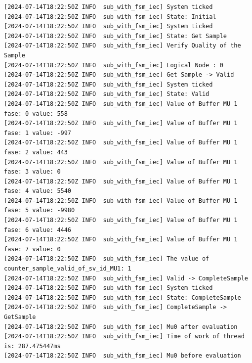 \begin{lstlisting}[caption={First scenario showing the steps through the state machine between the state Get Sample -> Valid, Valid -> Complete Sample -> Get Sample.}]
[2024-07-14T18:22:50Z INFO  sub_with_fsm_iec] System ticked
[2024-07-14T18:22:50Z INFO  sub_with_fsm_iec] State: Initial
[2024-07-14T18:22:50Z INFO  sub_with_fsm_iec] System ticked
[2024-07-14T18:22:50Z INFO  sub_with_fsm_iec] State: Get Sample
[2024-07-14T18:22:50Z INFO  sub_with_fsm_iec] Verify Quality of the Sample
[2024-07-14T18:22:50Z INFO  sub_with_fsm_iec] Logical Node : 0
[2024-07-14T18:22:50Z INFO  sub_with_fsm_iec] Get Sample -> Valid
[2024-07-14T18:22:50Z INFO  sub_with_fsm_iec] System ticked
[2024-07-14T18:22:50Z INFO  sub_with_fsm_iec] State: Valid
[2024-07-14T18:22:50Z INFO  sub_with_fsm_iec] Value of Buffer MU 1 fase: 0 value: 558
[2024-07-14T18:22:50Z INFO  sub_with_fsm_iec] Value of Buffer MU 1 fase: 1 value: -997
[2024-07-14T18:22:50Z INFO  sub_with_fsm_iec] Value of Buffer MU 1 fase: 2 value: 443
[2024-07-14T18:22:50Z INFO  sub_with_fsm_iec] Value of Buffer MU 1 fase: 3 value: 0
[2024-07-14T18:22:50Z INFO  sub_with_fsm_iec] Value of Buffer MU 1 fase: 4 value: 5540
[2024-07-14T18:22:50Z INFO  sub_with_fsm_iec] Value of Buffer MU 1 fase: 5 value: -9980
[2024-07-14T18:22:50Z INFO  sub_with_fsm_iec] Value of Buffer MU 1 fase: 6 value: 4446
[2024-07-14T18:22:50Z INFO  sub_with_fsm_iec] Value of Buffer MU 1 fase: 7 value: 0
[2024-07-14T18:22:50Z INFO  sub_with_fsm_iec] The value of counter_sample_valid_of_sv_id_MU1: 1
[2024-07-14T18:22:50Z INFO  sub_with_fsm_iec] Valid -> CompleteSample
[2024-07-14T18:22:50Z INFO  sub_with_fsm_iec] System ticked
[2024-07-14T18:22:50Z INFO  sub_with_fsm_iec] State: CompleteSample
[2024-07-14T18:22:50Z INFO  sub_with_fsm_iec] CompleteSample -> GetSample
[2024-07-14T18:22:50Z INFO  sub_with_fsm_iec] Mu0 after evaluation
[2024-07-14T18:22:50Z INFO  sub_with_fsm_iec] Time of work of thread is: 287.475447ms
[2024-07-14T18:22:50Z INFO  sub_with_fsm_iec] Mu0 before evaluation
\end{lstlisting}

